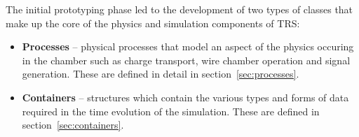 \documentclass[twoside]{article}
\newcommand{\name}[1]{\textsf{#1}}%
\begin{document}
The initial prototyping
phase led to the development of two types of classes
that make up the core of the physics and simulation components of
\name{TRS}:
\begin{itemize}
   \item {\bf Processes} -- physical processes that model an aspect of 
     the physics occuring
     in the chamber such as charge transport, wire chamber operation
     and signal generation.  These are defined in detail in 
     section~\ref{sec:processes}.
   \item {\bf Containers} -- structures which contain the various types and
     forms of data required in the time evolution of the simulation.
     These are defined in section~\ref{sec:containers}. 
\end{itemize}
\end{document}
